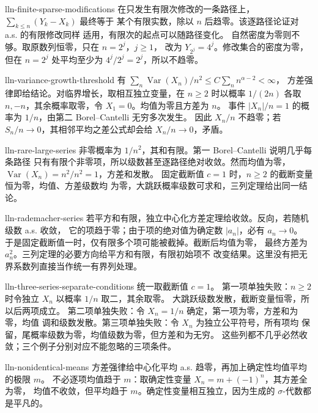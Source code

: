 \begin{solution}{lln-finite-sparse-modifications}
在只发生有限次修改的一条路径上，$\sum_{k\le n}(Y_k-X_k)$ 最终等于
某个有限实数，除以 $n$ 后趋零。该逐路径论证对 a.s. 的有限修改同样
适用，有限次的起点可以随路径变化。
自然密度为零则不够。取原数列恒零，只在 $n=2^j$，$j\ge1$，
改为 $Y_{2^j}=4^j$。修改集合的密度为零，但在 $n=2^j$ 处平均至少为
$4^j/2^j=2^j$，所以不趋零。
\end{solution}

\begin{solution}{lln-variance-growth-threshold}
有 $\sum_n\operatorname{Var}(X_n)/n^2\le C\sum_nn^{\alpha-2}<\infty$，
方差强律即给结论。对临界增长，取相互独立变量，在 $n\ge2$ 时以概率
$1/(2n)$ 各取 $n,-n$，其余概率取零，令 $X_1=0$。均值为零且方差为 $n$。
事件 $|X_n|/n=1$ 的概率为 $1/n$，由第二 Borel--Cantelli 无穷多次发生。
因此 $X_n/n$ 不趋零；若 $S_n/n\to0$，其相邻平均之差公式却会给
$X_n/n\to0$，矛盾。
\end{solution}

\begin{solution}{lln-rare-large-series}
非零概率为 $1/n^2$，其和有限。第一 Borel--Cantelli 说明几乎每条路径
只有有限个非零项，所以级数甚至逐路径绝对收敛。然而均值为零，
$\operatorname{Var}(X_n)=n^2/n^2=1$，方差和发散。
固定截断值 $c=1$ 时，$n\ge2$ 的截断变量恒为零，均值、方差级数均
为零，大跳跃概率级数可求和，三列定理给出同一结论。
\end{solution}

\begin{solution}{lln-rademacher-series}
若平方和有限，独立中心化方差定理给收敛。反向，若随机级数 a.s. 收敛，
它的项趋于零；由于项的绝对值为确定数 $|a_n|$，必有 $a_n\to0$。
于是固定截断值一时，仅有限多个项可能被截掉。截断后均值为零，
最终方差为 $a_n^2$。三列定理的必要方向给平方和有限，有限初始项不
改变结果。这里没有把无界系数列直接当作统一有界列处理。
\end{solution}

\begin{solution}{lln-three-series-separate-conditions}
统一取截断值 $c=1$。
第一项单独失败：$n\ge2$ 时令独立 $X_n$ 以概率 $1/n$ 取二，其余取零。
大跳跃级数发散，截断变量恒零，所以后两项成立。
第二项单独失败：令 $X_n=1/n$ 确定，第一项为零，方差和为零，均值
调和级数发散。第三项单独失败：令 $X_n$ 为独立公平符号，所有项均
保留，尾概率级数为零，均值级数为零，但方差和为无穷。
这些列都不几乎必然收敛；三个例子分别对应不能忽略的三项条件。
\end{solution}

\begin{solution}{lln-nonidentical-means}
方差强律给中心化平均 a.s. 趋零，再加上确定性均值平均的极限 $m$。
不必逐项均值趋于 $m$：取确定性变量 $X_n=m+(-1)^n$，其方差全为零，
均值不收敛，但平均趋于 $m$。确定性变量相互独立，因为生成的
$\sigma$-代数都是平凡的。
\end{solution}

